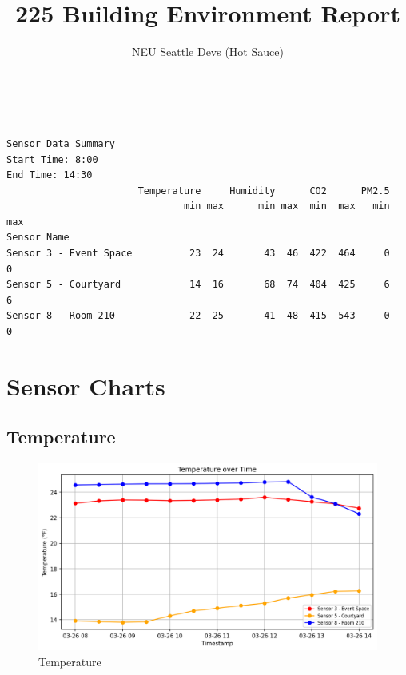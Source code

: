 \documentclass[
  12pt,
  letterpaper,
]{article}
\title{225 Building Environment Report}
\author{NEU Seattle Devs (Hot Sauce)}
\date{}
\renewcommand*\contentsname{Table of contents}
\newcommand\contentsname{Table of contents}
\begin{document}
\maketitle

\renewcommand*\contentsname{Table of contents}
{
\hypersetup{linkcolor=}
\setcounter{tocdepth}{3}
\tableofcontents
}

\begin{verbatim}


Sensor Data Summary
Start Time: 8:00
End Time: 14:30
                       Temperature     Humidity      CO2      PM2.5    
                               min max      min max  min  max   min max
Sensor Name                                                            
Sensor 3 - Event Space          23  24       43  46  422  464     0   0
Sensor 5 - Courtyard            14  16       68  74  404  425     6   6
Sensor 8 - Room 210             22  25       41  48  415  543     0   0
\end{verbatim}

\section{Sensor Charts}\label{sensor-charts}

\subsection{Temperature}\label{temperature}

\begin{figure}[H]

{\centering \includegraphics[width=0.85\linewidth,height=\textheight,keepaspectratio]{./charts/temperature_chart.png}

}

\caption{Temperature}

\end{figure}%
\end{document}
